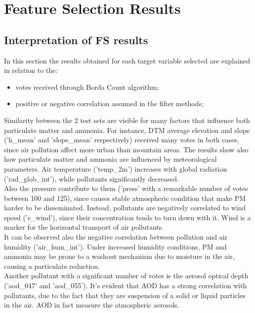 \section{Feature Selection Results}
\subsection{Interpretation of FS results}
In this section the results obtained for each target variable selected are explained in relation to the:
\begin{itemize}
    \item votes received through Borda Count algorithm;
    \item positive or negative correlation assumed in the filter methods;
\end{itemize}
Similarity between the 2 test sets are visible for many factors that influence both particulate matter and ammonia.
For instance, DTM average elevation and slope ('h\_mean' and 'slope\_mean' respectively) received many votes in both cases, since air pollution affect more urban than mountain areas.
The results show also how particulate matter and ammonia are influenced by meteorological parameters.
Air temperature ('temp\_2m') increases with global radiation ('rad\_glob\_int'), while pollutants significantly decreased\cite{li2015particulate}. \\
Also the pressure contribute to them ('press' with a remarkable number of votes between 100 and 125), since causes stable atmospheric condition that make PM harder to be disseminated. 
Instead, pollutants are negatively correlated to wind speed ('e\_wind'), since their concentration tends to turn down with it. Wind is a marker for the horizontal transport of air pollutants.\\
It can be observed also the negative correlation between pollution and air humidity ('air\_hum\_int').
Under increased humidity conditions, PM and ammonia may be prone to a washout mechanism due to moisture in the air, causing a particulate reduction\cite{biglari2017relationship}.\\
Another pollutant with a significant number of votes is the aerosol optical depth ('aod\_047' and 'aod\_055'). It's evident that AOD has a strong correlation with pollutants, due to the fact that they are suspension of a solid or liquid particles in the air. AOD in fact measure the atmospheric aerosols.
